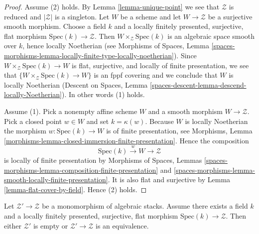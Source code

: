\begin{proof}
Assume (2) holds. By
Lemma \ref{lemma-unique-point}
we see that $\mathcal{Z}$ is reduced and $|\mathcal{Z}|$ is a singleton.
Let $W$ be a scheme and let $W \to \mathcal{Z}$ be a surjective smooth
morphism. Choose a field $k$ and a locally finitely presented, surjective,
flat morphism $\text{Spec}(k) \to \mathcal{Z}$.
Then $W \times_\mathcal{Z} \text{Spec}(k)$ is an algebraic space
smooth over $k$, hence locally Noetherian (see
Morphisms of Spaces, Lemma
\ref{spaces-morphisms-lemma-locally-finite-type-locally-noetherian}).
Since $W \times_\mathcal{Z} \text{Spec}(k) \to W$
is flat, surjective, and locally of finite presentation, we see
that $\{W \times_\mathcal{Z} \text{Spec}(k) \to W\}$ is an fppf covering
and we conclude that $W$ is locally Noetherian
(Descent on Spaces, Lemma
\ref{spaces-descent-lemma-descend-locally-Noetherian}).
In other words (1) holds.

\medskip\noindent
Assume (1). Pick a nonempty affine scheme $W$ and a smooth morphism
$W \to \mathcal{Z}$. Pick a closed point $w \in W$ and set
$k = \kappa(w)$. Because $W$ is locally Noetherian the morphism
$w : \text{Spec}(k) \to W$ is of finite presentation, see
Morphisms, Lemma \ref{morphisms-lemma-closed-immersion-finite-presentation}.
Hence the composition
$$
\text{Spec}(k) \xrightarrow{w} W \longrightarrow \mathcal{Z}
$$
is locally of finite presentation by
Morphisms of Spaces, Lemmas
\ref{spaces-morphisms-lemma-composition-finite-presentation} and
\ref{spaces-morphisms-lemma-smooth-locally-finite-presentation}.
It is also flat and surjective by
Lemma \ref{lemma-flat-cover-by-field}.
Hence (2) holds.
\end{proof}

\begin{lemma}
\label{lemma-monomorphism-into-point}
Let $\mathcal{Z}' \to \mathcal{Z}$ be a monomorphism of algebraic stacks.
Assume there exists a field $k$ and a locally finitely presented, surjective,
flat morphism $\text{Spec}(k) \to \mathcal{Z}$. Then either $\mathcal{Z}'$
is empty or $\mathcal{Z}' \to \mathcal{Z}$ is an equivalence.
\end{lemma}

